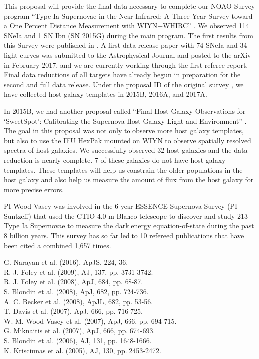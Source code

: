 \documentclass[11pt]{article}
\begin{document}
\thepast

This proposal will provide the final data necessary to complete our NOAO Survey 
program ``Type Ia Supernovae in the Near-Infrared: A Three-Year Survey toward a One Percent Distance Measurement with WIYN+WHIRC'' .
We observed 114 SNeIa and 1 SN Ibn (SN 2015G) during the main program.
The first results from this Survey were published in \cite{weyant14}.  
A first data release paper with 74 SNeIa and 34 light curves was submitted to the Astrophysical Journal and posted to the arXiv in February 2017\cite{weyant17}, and we are currently working through the first referee report.
Final data reductions of all targets have already begun in preparation for the second and full data release.
Under the proposal ID of the original survey  , we have collected host galaxy templates in 2015B, 2016A, and 2017A.

In 2015B, we had another proposal called  ``Final Host Galaxy Observations for `SweetSpot': Calibrating the Supernova Host Galaxy Light and Environment'' .
The goal in this proposal was not only to observe more host galaxy templates, but also to use the IFU HexPak mounted on WIYN to observe spatially resolved spectra of host galaxies. 
We successfully observed 32 host galaxies and the data reduction is nearly complete. 
7 of these galaxies do not have host galaxy templates. 
These templates will help us constrain the older populations in the host galaxy and also help us measure the amount of flux from the host galaxy for more precise errors.

PI Wood-Vasey was involved in the 6-year ESSENCE Supernova Survey (PI Suntzeff) that used the CTIO 4.0-m Blanco telescope to discover and study 213 Type Ia Supernovae to measure the dark energy equation-of-state during the past 8 billion years.  This survey has so far led to 10 refereed publications that have been cited a combined 1,657 times.

G. Narayan et al. (2016), ApJS, 224, 36.  \\  %
R. J. Foley et al. (2009), AJ, 137, pp. 3731-3742.  \\  %
R. J. Foley et al. (2008), ApJ, 684, pp. 68-87.  \\  %
S. Blondin et al. (2008), ApJ, 682, pp. 724-736.  \\  %
A. C. Becker et al. (2008), ApJL, 682, pp. 53-56. \\  %
T. Davis et al. (2007), ApJ, 666, pp. 716-725.  \\  %
W. M. Wood-Vasey et al. (2007), ApJ, 666, pp. 694-715. \\  %
G. Miknaitis et al. (2007), ApJ, 666, pp. 674-693. \\  %
S. Blondin et al. (2006), AJ, 131, pp. 1648-1666. \\  %
K. Krisciunas et al. (2005), AJ, 130, pp. 2453-2472. \\  %
\end{document}
